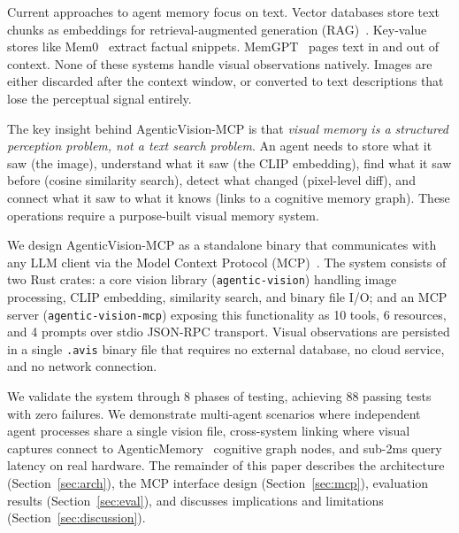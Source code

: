 \documentclass[10pt, twocolumn]{article}
\begin{document}
Current approaches to agent memory focus on text. Vector databases store text chunks as embeddings for retrieval-augmented generation (RAG)~\cite{lewis2020rag}. Key-value stores like Mem0~\cite{mem0} extract factual snippets. MemGPT~\cite{packer2023memgpt} pages text in and out of context. None of these systems handle visual observations natively. Images are either discarded after the context window, or converted to text descriptions that lose the perceptual signal entirely.

The key insight behind AgenticVision-MCP is that \textit{visual memory is a structured perception problem, not a text search problem}. An agent needs to store what it saw (the image), understand what it saw (the CLIP embedding), find what it saw before (cosine similarity search), detect what changed (pixel-level diff), and connect what it saw to what it knows (links to a cognitive memory graph). These operations require a purpose-built visual memory system.

We design AgenticVision-MCP as a standalone binary that communicates with any LLM client via the Model Context Protocol (MCP)~\cite{mcp2024spec}. The system consists of two Rust crates: a core vision library (\texttt{agentic-vision}) handling image processing, CLIP embedding, similarity search, and binary file I/O; and an MCP server (\texttt{agentic-vision-mcp}) exposing this functionality as 10 tools, 6 resources, and 4 prompts over stdio JSON-RPC transport. Visual observations are persisted in a single \texttt{.avis} binary file that requires no external database, no cloud service, and no network connection.

We validate the system through 8 phases of testing, achieving 88 passing tests with zero failures. We demonstrate multi-agent scenarios where independent agent processes share a single vision file, cross-system linking where visual captures connect to AgenticMemory~\cite{owolabi2025agenticmemory} cognitive graph nodes, and sub-2ms query latency on real hardware. The remainder of this paper describes the architecture (Section~\ref{sec:arch}), the MCP interface design (Section~\ref{sec:mcp}), evaluation results (Section~\ref{sec:eval}), and discusses implications and limitations (Section~\ref{sec:discussion}).
\end{document}
